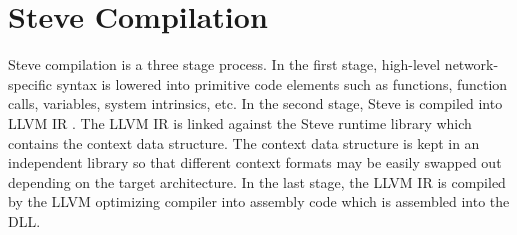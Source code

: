 \section{Steve Compilation} \label{compile}

Steve compilation is a three stage process.
In the first stage, high-level network-specific syntax is lowered into primitive code elements such as functions, function calls, variables, system intrinsics, etc.
In the second stage, Steve is compiled into LLVM IR \cite{llvm_webpage}. The LLVM IR is linked against the Steve runtime library which contains the context data structure. The context data structure is kept in an independent library so that different context formats may be easily swapped out depending on the target architecture.
In the last stage, the LLVM IR is compiled by the LLVM optimizing compiler into assembly code which is assembled into the DLL.